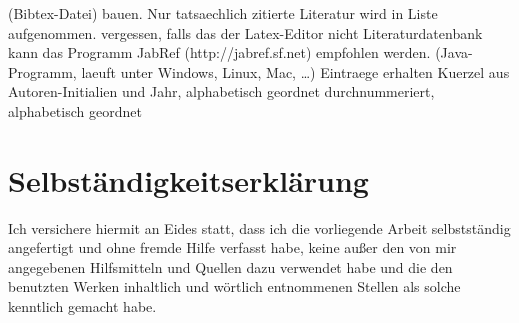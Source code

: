 (Bibtex-Datei) bauen. Nur tatsaechlich zitierte Literatur wird in Liste
aufgenommen. %
vergessen, falls das der Latex-Editor nicht %
Literaturdatenbank kann das Programm JabRef (http://jabref.sf.net) empfohlen
werden. (Java-Programm, laeuft unter Windows, Linux, Mac, \ldots)
Eintraege erhalten Kuerzel aus Autoren-Initialien und Jahr, alphabetisch
geordnet %
durchnummeriert, alphabetisch geordnet  \newpage
\thispagestyle{empty} \section*{Selbständigkeitserklärung} Ich versichere
hiermit an Eides statt, dass ich die vorliegende Arbeit selbstständig
angefertigt und ohne fremde Hilfe verfasst habe, keine außer den von mir
angegebenen Hilfsmitteln und Quellen dazu verwendet habe und die den benutzten
Werken inhaltlich und wörtlich entnommenen Stellen als solche kenntlich gemacht
habe. \vspace*{2cm}

\begin{flushright} \theLocationAndDate{} \end{flushright}
